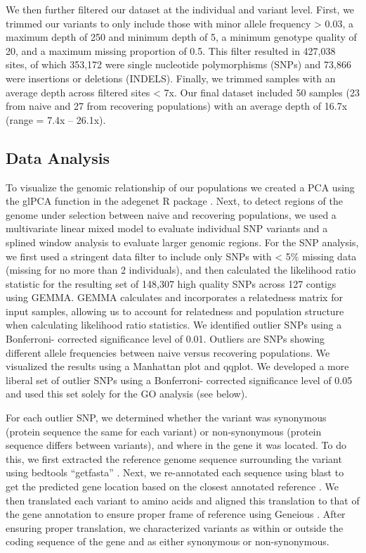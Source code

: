 \documentclass[9pt,twocolumn,twoside,lineno]{pnas-new}
\begin{document}
{We then further filtered our dataset at the individual and variant
level. First, we trimmed our variants to only include those with minor
allele frequency \textgreater{} 0.03, a maximum depth of 250 and minimum
depth of 5, a minimum genotype quality of 20, and a maximum missing
proportion of 0.5. This filter resulted in 427,038 sites, of which
353,172 were single nucleotide polymorphisms (SNPs) and 73,866 were
insertions or deletions (INDELS). Finally, we trimmed samples with an
average depth across filtered sites \textless{} 7x. Our final dataset
included 50 samples (23 from naive and 27 from recovering populations)
with an average depth of 16.7x (range = 7.4x -- 26.1x).

\hypertarget{data-analysis}{%
\subsection*{Data Analysis}\label{data-analysis}}

To visualize the genomic relationship of our populations we created a
PCA using the glPCA function in the adegenet R package
\citep{jombart2008}. Next, to detect regions of the genome under
selection between naive and recovering populations, we used a
multivariate linear mixed model to evaluate individual SNP variants and
a splined window analysis to evaluate larger genomic regions. For the
SNP analysis, we first used a stringent data filter to include only SNPs
with \textless{} 5\% missing data (missing for no more than 2
individuals), and then calculated the likelihood ratio statistic for the
resulting set of 148,307 high quality SNPs across 127 contigs using
GEMMA. GEMMA calculates and incorporates a relatedness matrix for input
samples, allowing us to account for relatedness and population structure
when calculating likelihood ratio statistics. We identified outlier SNPs
using a Bonferroni- corrected significance level of 0.01. Outliers are
SNPs showing different allele frequencies between naive versus
recovering populations. We visualized the results using a Manhattan plot
and qqplot. We developed a more liberal set of outlier SNPs using a
Bonferroni- corrected significance level of 0.05 and used this set
solely for the GO analysis (see below).

For each outlier SNP, we determined whether the variant was synonymous
(protein sequence the same for each variant) or non-synonymous (protein
sequence differs between variants), and where in the gene it was
located. To do this, we first extracted the reference genome sequence
surrounding the variant using bedtools ``getfasta'' \citep{quinlan2010}.
Next, we re-annotated each sequence using blast to get the predicted
gene location based on the closest annotated reference
\citep{altschul1997}. We then translated each variant to amino acids and
aligned this translation to that of the gene annotation to ensure proper
frame of reference using Geneious \citep{kearse2012}. After ensuring
proper translation, we characterized variants as within or outside the
coding sequence of the gene and as either synonymous or non-synonymous.

}
\end{document}
